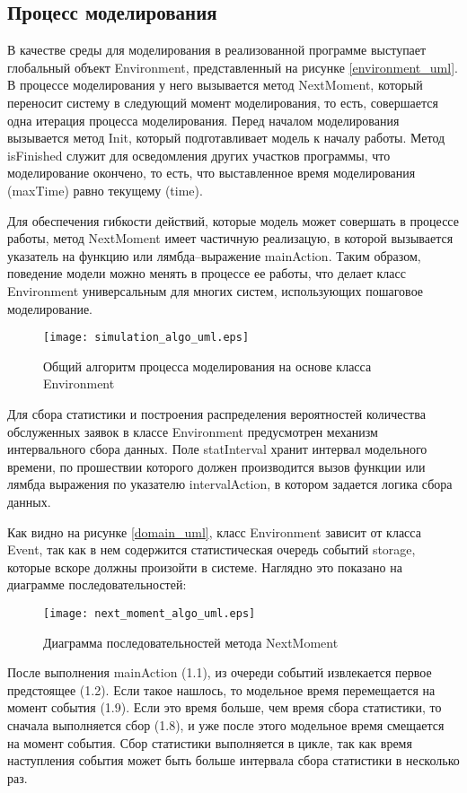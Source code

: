 \subsection{Процесс моделирования}
В качестве среды для моделирования в реализованной программе выступает глобальный объект Environment, представленный на рисунке \ref{environment_uml}. В процессе моделирования у него вызывается метод NextMoment, который переносит систему в следующий момент моделирования, то есть, совершается одна итерация процесса моделирования. Перед началом моделирования вызывается метод Init, который подготавливает модель к началу работы. Метод isFinished служит для осведомления других участков программы, что моделирование окончено, то есть, что выставленное время моделирования (maxTime) равно текущему (time).

Для обеспечения гибкости действий, которые модель может совершать в процессе работы, метод NextMoment имеет частичную реализацую, в которой вызывается указатель на функцию или лямбда--выражение mainAction. Таким образом, поведение модели можно менять в процессе ее работы, что делает класс Environment универсальным для многих систем, использующих пошаговое моделирование.
\begin{figure}[H]
	\centering
	\texttt{[image: simulation\_algo\_uml.eps]}
	\caption{Общий алгоритм процесса моделирования на основе класса Environment}
	\label{simulation_algo_uml}
\end{figure}

Для сбора статистики и построения распределения вероятностей количества обслуженных заявок в классе Environment предусмотрен механизм интервального сбора данных. Поле statInterval хранит интервал модельного времени, по прошествии которого должен производится вызов функции или лямбда выражения по указателю intervalAction, в котором задается логика сбора данных.

Как видно на рисунке \ref{domain_uml}, класс Environment зависит от класса Event, так как в нем содержится статистическая очередь событий storage, которые вскоре должны произойти в системе. Наглядно это показано на диаграмме последовательностей:
\begin{figure}[H]
	\centering
	\texttt{[image: next\_moment\_algo\_uml.eps]}
	\caption{Диаграмма последовательностей метода NextMoment}
	\label{next_moment_algo_uml}
\end{figure}
После выполнения mainAction (1.1), из очереди событий извлекается первое предстоящее (1.2). Если такое нашлось, то модельное время перемещается на момент события (1.9). Если это время больше, чем время сбора статистики, то сначала выполняется сбор (1.8), и уже после этого модельное время смещается на момент события. Сбор статистики выполняется в цикле, так как время наступления события может быть больше интервала сбора статистики в несколько раз.
\clearpage
